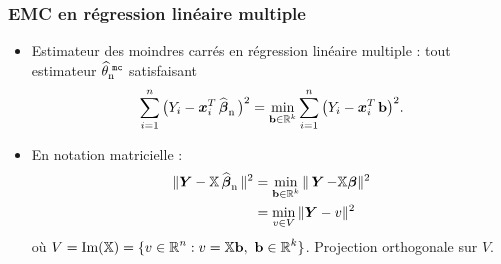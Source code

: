 





\begin{frame}
\frametitle{EMC en régression linéaire multiple}
\begin{itemize}
\item Estimateur des \alert{moindres carrés} en régression
linéaire multiple : tout estimateur $\operatorname{\widehat \theta_n^{\,\,{\tt mc}}}$ satisfaisant
$$\sum_{i = 1}^n
\big(Y_i- \operatorname{\boldsymbol{x}}_i^T \operatorname{\widehat{\boldsymbol{\beta}}_n} \big)^2 = \min_{\mathbf{b} \in \operatorname{{\mathbb R}}^k}\sum_{i =
1}^n \big(Y_i- \operatorname{\boldsymbol{x}}_i^T \mathbf{b}\big)^2.$$
\item En notation matricielle :
\begin{align*} 
\|\boldsymbol{Y}-\mathbb{X}\operatorname{\widehat{\boldsymbol{\beta}}_n}\|^2 &=   \min_{\mathbf{b} \in \operatorname{{\mathbb R}}^k}\|\operatorname{\boldsymbol{Y}} -\mathbb{X}\boldsymbol{\beta}\|^2\\
&= \min_{v \in V}\|\boldsymbol{Y}-v\|^2
\end{align*}
o\`u $V=\text{Im}(\mathbb{X}) = \{v\in \operatorname{{\mathbb R}}^n: v=\mathbb{X} \mathbf{b}, \
\mathbf{b} \in \operatorname{{\mathbb R}}^k\}$. \alert{Projection orthogonale sur $V$}.
\end{itemize}
\end{frame}


